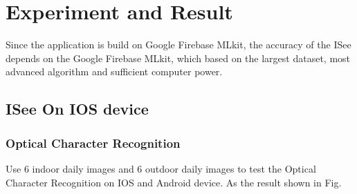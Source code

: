 \documentclass[11pt]{ucscthesis}
\begin{document}
\chapter{Experiment and Result}

Since the application is build on Google Firebase MLkit, the accuracy of the ISee depends on the Google Firebase MLkit, which based on the largest dataset, most advanced algorithm and sufficient computer power.
\section{ISee On IOS device}
\subsection{Optical Character Recognition}

 Use 6 indoor daily images and 6 outdoor daily images to test the Optical Character Recognition on IOS and Android device. As the result shown in Fig.
\end{document}
